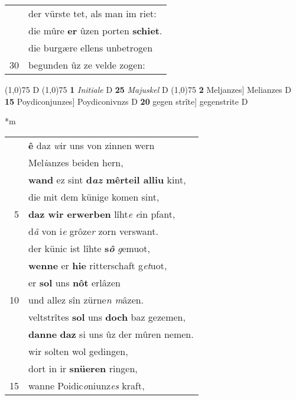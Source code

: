\documentclass[8pt,a4paper,notitlepage]{article}
\begin{document}
\begin{table}[ht]
\begin{minipage}[t]{0.5\linewidth}
\begin{tabular}{rl}
 & der vürste tet, als man im riet:\\ 
 & die mûre \textbf{er} ûzen porten \textbf{schiet}.\\ 
 & die burgære ellens unbetrogen\\ 
30 & begunden ûz ze velde zogen:\\ 
\end{tabular}
\scriptsize
\line(1,0){75} \newline
D \newline
\line(1,0){75} \newline
\textbf{1} \textit{Initiale} D  \textbf{25} \textit{Majuskel} D  \newline
\line(1,0){75} \newline
\textbf{2} Meljanzes] Melianzes D \textbf{15} Poydiconjunzes] Poydiconivnzs D \textbf{20} gegen strîte] gegenstrite D \newline
\end{minipage}
\hspace{0.5cm}
\begin{minipage}[t]{0.5\linewidth}
\small
\begin{center}*m
\end{center}
\begin{tabular}{rl}
 & \textbf{ê} daz \textit{w}ir uns von zinnen wern\\ 
 & Mel\textit{i}anzes beiden hern,\\ 
 & \textbf{wand} ez sint \textbf{d\textit{az} mêrteil alliu} kint,\\ 
 & die mit dem künige komen sint,\\ 
5 & \textbf{daz wir erwerben} lîht\textit{e} \textit{e}in pfant,\\ 
 & d\textit{â} von i\textit{e} grôze\textit{r} zorn verswant.\\ 
 & der künic ist lîhte \textbf{s\textit{ô}} \textit{g}emuot,\\ 
 & \textbf{wenne} er \textbf{hie} ritterschaft g\textit{et}uot,\\ 
 & er \textbf{sol} uns \textbf{nôt} erlâzen\\ 
10 & und allez sîn zürne\textit{n m}âzen.\\ 
 & veltstrîtes \textbf{sol} uns \textbf{doch} baz gezemen,\\ 
 & \textbf{danne} \textbf{daz} si uns ûz der mûren nemen.\\ 
 & wir solten wol gedingen,\\ 
 & dort in ir \textbf{snüeren} ringen,\\ 
15 & wanne Poidic\textit{o}niunz\textit{es} kraft,\\ 

\end{tabular}
\end{minipage}
\end{table}
\end{document}
